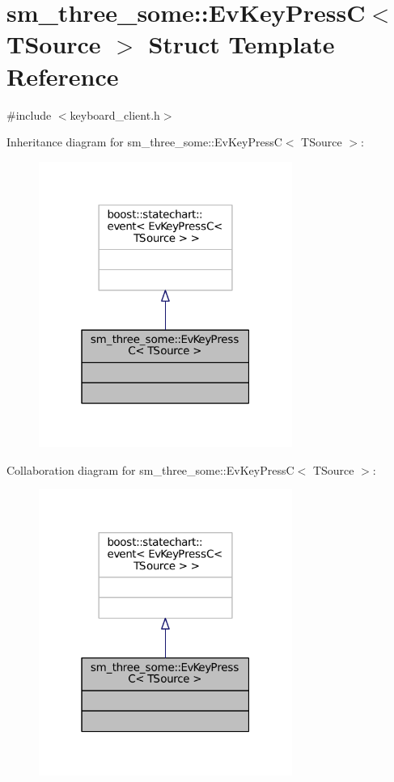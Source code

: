 \hypertarget{structsm__three__some_1_1EvKeyPressC}{}\section{sm\+\_\+three\+\_\+some\+:\+:Ev\+Key\+PressC$<$ T\+Source $>$ Struct Template Reference}
\label{structsm__three__some_1_1EvKeyPressC}


{\ttfamily \#include $<$keyboard\+\_\+client.\+h$>$}



Inheritance diagram for sm\+\_\+three\+\_\+some\+:\+:Ev\+Key\+PressC$<$ T\+Source $>$\+:
\nopagebreak
\begin{figure}[H]
\begin{center}
\leavevmode
\includegraphics[width=235pt]{structsm__three__some_1_1EvKeyPressC__inherit__graph}
\end{center}
\end{figure}


Collaboration diagram for sm\+\_\+three\+\_\+some\+:\+:Ev\+Key\+PressC$<$ T\+Source $>$\+:
\nopagebreak
\begin{figure}[H]
\begin{center}
\leavevmode
\includegraphics[width=235pt]{structsm__three__some_1_1EvKeyPressC__coll__graph}
\end{center}
\end{figure}


